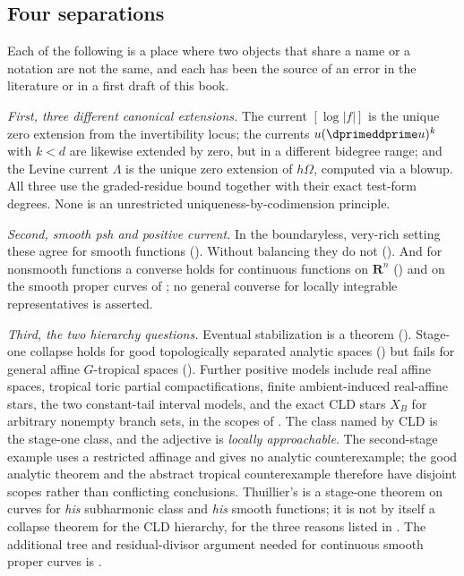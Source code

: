 \subsection{Four separations}

Each of the following is a place where two objects that share a name or a
notation are not the same, and each has been the source of an error in the
literature or in a first draft of this book.

\emph{First, three different canonical extensions.}  The current
$[\log|f|]$ is the unique zero extension from the invertibility locus; the
currents $u(\dprimeddprime u)^k$ with $k<d$ are likewise extended by zero,
but in a different bidegree range; and the Levine current $\Lambda$
is the unique zero extension of $h\Omega$, computed via a blowup.
All three use the graded-residue bound together with their exact test-form
degrees.  None is an unrestricted uniqueness-by-codimension principle.

\emph{Second, smooth psh and positive current.}  In the boundaryless,
very-rich setting these agree for smooth functions ().
Without balancing they do not ().  And for
nonsmooth functions a converse holds for continuous functions on
$\mathbf R^n$ () and on the smooth proper
curves of ;
no general converse for locally integrable representatives is asserted.

\emph{Third, the two hierarchy questions.}  Eventual stabilization is a
theorem ().  Stage-one collapse holds
for good topologically separated analytic spaces
() but fails for general affine
$G$-tropical spaces ().  Further
positive models include real affine spaces, tropical toric partial
compactifications, finite ambient-induced
real-affine stars, the two constant-tail interval models, and the exact CLD
stars $X_B$ for arbitrary nonempty branch sets, in the scopes of
.  The class named by CLD is the
stage-one class, and the adjective is \emph{locally approachable}.  The
second-stage example uses a restricted affinage and gives no analytic
counterexample; the good analytic theorem and the abstract tropical
counterexample therefore have disjoint scopes rather than conflicting
conclusions.
Thuillier's  is a stage-one theorem
on curves for \emph{his} subharmonic class and \emph{his} smooth functions;
it is not by itself a collapse theorem for the CLD hierarchy, for the three
reasons listed in .  The additional tree and
residual-divisor argument needed for continuous smooth proper curves is
.

